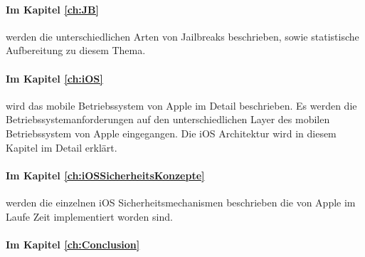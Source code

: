 \paragraph{Im Kapitel \ref{ch:JB}} werden die unterschiedlichen Arten von Jailbreaks beschrieben, sowie statistische Aufbereitung zu diesem Thema.

\paragraph{Im Kapitel \ref{ch:iOS}} wird das mobile Betriebssystem von Apple im Detail beschrieben. Es werden die Betriebssystemanforderungen auf den unterschiedlichen Layer des mobilen Betriebssystem von Apple eingegangen. Die iOS Architektur wird in diesem Kapitel im Detail erklärt. 

\paragraph{Im Kapitel \ref{ch:iOSSicherheitsKonzepte}} werden die einzelnen iOS Sicherheitsmechanismen beschrieben die von Apple im Laufe Zeit implementiert worden sind.

\paragraph{Im Kapitel \ref{ch:Conclusion}}



